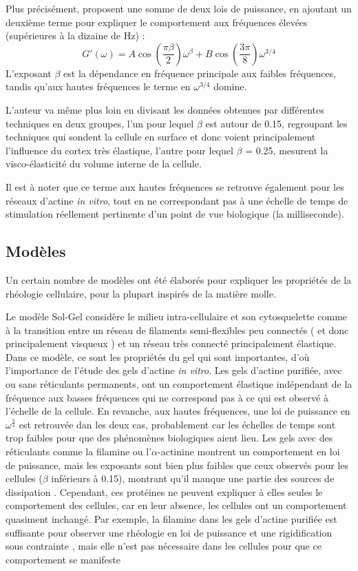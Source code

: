 \documentclass{report}
\begin{document}
 Plus précisément, \cite{hoffner} proposent une somme de deux lois de puissance, en ajoutant un deuxième terme pour expliquer le comportement aux fréquences élevées (supérieures à la dizaine de Hz) : 
$$G'(\omega)= A \cos \left(\frac{\pi \beta}{2}\right) \omega^{\beta} + B \cos\left(\frac{3 \pi}{8}\right) \omega^{3/4}$$
L'exposant $\beta$ est la dépendance en fréquence principale aux faibles fréquences, tandis qu'aux hautes fréquences le terme en $\omega^{3/4}$ domine. 

L'auteur va même plus loin en divisant les données obtenues par différentes techniques en deux groupes, l'un pour lequel $\beta$ est autour de 0.15, regroupant les techniques qui sondent la cellule en surface et donc voient principalement l'influence du cortex très élastique, l'autre pour lequel $\beta$ = 0.25, mesurent la visco-élasticité du volume interne de la cellule. 

Il est à noter que ce terme aux hautes fréquences se retrouve également pour les réseaux d'actine \textit{in vitro}, tout en ne correspondant pas à une échelle de temps de stimulation réellement pertinente d'un point de vue biologique (la milliseconde). 




\subsection{Modèles}

Un certain nombre de modèles ont été élaborés pour expliquer les propriétés de la rhéologie cellulaire, pour la plupart inspirés de la matière molle. 

Le modèle Sol-Gel considère le milieu intra-cellulaire et son cytosquelette comme à la transition entre un réseau de filaments semi-flexibles peu connectés ( et donc principalement visqueux ) et un réseau très connecté principalement élastique. 
Dans ce modèle, ce sont les propriétés du gel qui sont importantes,  d'où l'importance de l'étude des gels d'actine \textit{in vitro}. 
Les gels d'actine purifiée, avec ou sans réticulants permanents, ont un comportement élastique indépendant de la fréquence aux basses fréquences qui ne correspond pas à ce qui est observé à l'échelle de la cellule. 
En revanche, aux hautes fréquences, une loi de puissance en $\omega^{\frac{3}{4}}$ est retrouvée dan les deux cas, probablement car les échelles de temps sont trop faibles pour que des phénomènes biologiques aient lieu. 
Les gels avec des réticulants comme la filamine ou l'$\alpha$-actinine montrent un comportement en loi de puissance, mais les exposants sont bien plus faibles que ceux observés pour les cellules ($\beta$ inférieurs à 0.15), montrant qu'il manque une partie des sources de dissipation \cite{gardel}.
Cependant, ces protéines ne peuvent expliquer à elles seules le comportement des cellules, car en leur absence, les cellules ont un comportement quasiment inchangé. Par exemple, la filamine dans les gels d'actine purifiée est suffisante pour observer une rhéologie en loi de puissance et une rigidification sous contrainte \cite{gardel}, mais elle n'est pas nécessaire dans les cellules pour que ce comportement se manifeste \cite{coughlin}
\end{document}
